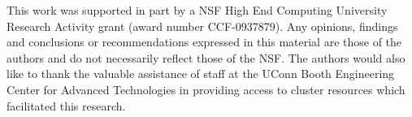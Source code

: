 This work was supported in part by a NSF High End Computing University
Research Activity grant (award number CCF-0937879). Any opinions,
findings and conclusions or recommendations expressed in this material
are those of the authors and do not necessarily reflect those of the
NSF. The authors would also like to thank the valuable assistance of staff
at the UConn Booth Engineering Center for Advanced Technologies in
providing access to cluster resources which facilitated this research.

